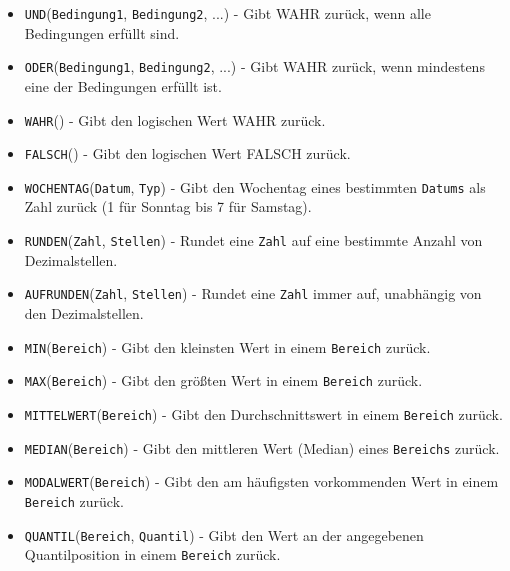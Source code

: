 \documentclass[11pt, oneside]{book}
\begin{document}
\begin{itemize}
    \item \texttt{UND}(\texttt{Bedingung1}, \texttt{Bedingung2}, ...) - Gibt WAHR zurück, wenn alle Bedingungen erfüllt sind.
    
    \item \texttt{ODER}(\texttt{Bedingung1}, \texttt{Bedingung2}, ...) - Gibt WAHR zurück, wenn mindestens eine der Bedingungen erfüllt ist.
    
    \item \texttt{WAHR}() - Gibt den logischen Wert WAHR zurück.
    
    \item \texttt{FALSCH}() - Gibt den logischen Wert FALSCH zurück.
    
    \item \texttt{WOCHENTAG}(\texttt{Datum}, \texttt{Typ}) - Gibt den Wochentag eines bestimmten \texttt{Datums} als Zahl zurück (1 für Sonntag bis 7 für Samstag).
    
    \item \texttt{RUNDEN}(\texttt{Zahl}, \texttt{Stellen}) - Rundet eine \texttt{Zahl} auf eine bestimmte Anzahl von Dezimalstellen.
    
    \item \texttt{AUFRUNDEN}(\texttt{Zahl}, \texttt{Stellen}) - Rundet eine \texttt{Zahl} immer auf, unabhängig von den Dezimalstellen.
    
    \item \texttt{MIN}(\texttt{Bereich}) - Gibt den kleinsten Wert in einem \texttt{Bereich} zurück.
    
    \item \texttt{MAX}(\texttt{Bereich}) - Gibt den größten Wert in einem \texttt{Bereich} zurück.
    
    \item \texttt{MITTELWERT}(\texttt{Bereich}) - Gibt den Durchschnittswert in einem \texttt{Bereich} zurück.
    
    \item \texttt{MEDIAN}(\texttt{Bereich}) - Gibt den mittleren Wert (Median) eines \texttt{Bereichs} zurück.
    
    \item \texttt{MODALWERT}(\texttt{Bereich}) - Gibt den am häufigsten vorkommenden Wert in einem \texttt{Bereich} zurück.
    
    \item \texttt{QUANTIL}(\texttt{Bereich}, \texttt{Quantil}) - Gibt den Wert an der angegebenen Quantilposition in einem \texttt{Bereich} zurück.
    

\end{itemize}
\end{document}
